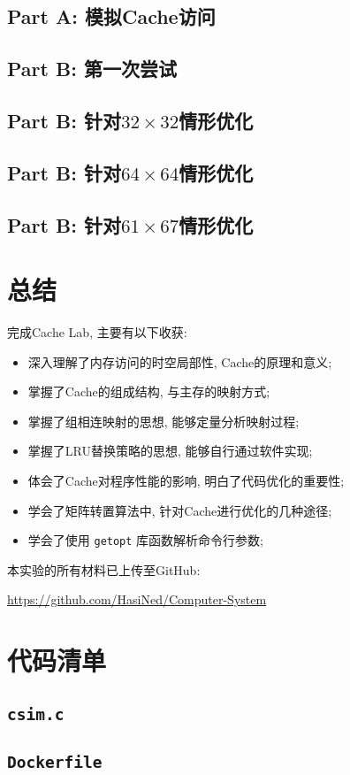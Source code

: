 \subsection{Part A: 模拟Cache访问}
\subsection{Part B: 第一次尝试}
\subsection[Part B: 针对32 x 32情形优化]{Part B: 针对$32 \times 32$情形优化}
\subsection[Part B: 针对64 x 64情形优化]{Part B: 针对$64 \times 64$情形优化}
\subsection[Part B: 针对61 x 67情形优化]{Part B: 针对$61 \times 67$情形优化}

\clearpage
\section{总结}

完成Cache Lab, 主要有以下收获:
\begin{itemize}
    \item 深入理解了内存访问的时空局部性, Cache的原理和意义;
    \item 掌握了Cache的组成结构, 与主存的映射方式;
    \item 掌握了组相连映射的思想, 能够定量分析映射过程;
    \item 掌握了LRU替换策略的思想, 能够自行通过软件实现;
    \item 体会了Cache对程序性能的影响, 明白了代码优化的重要性;
    \item 学会了矩阵转置算法中, 针对Cache进行优化的几种途径;
    \item 学会了使用 \verb|getopt| 库函数解析命令行参数;
\end{itemize}
本实验的所有材料已上传至GitHub:

\url{https://github.com/HasiNed/Computer-System}

\setupappendix

\clearpage
\section{代码清单}\label{codelist}

\subsection{\texttt{csim.c}}\label{csim-c}

\subsection{\texttt{Dockerfile}}\label{dockerfile}
